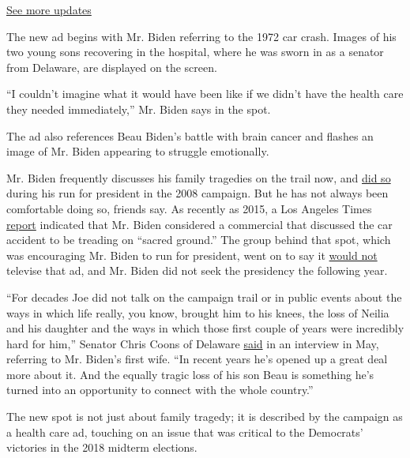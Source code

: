 \href{https://www.nytimes.com/2020/07/31/us/elections/biden-vs-trump.html?action=click\&pgtype=Article\&state=default\&region=MAIN_CONTENT_1\&context=storylines_live_updates}{See
more updates}

The new ad begins with Mr. Biden referring to the 1972 car crash. Images
of his two young sons recovering in the hospital, where he was sworn in
as a senator from Delaware, are displayed on the screen.

``I couldn't imagine what it would have been like if we didn't have the
health care they needed immediately,'' Mr. Biden says in the spot.

The ad also references Beau Biden's battle with brain cancer and flashes
an image of Mr. Biden appearing to struggle emotionally.

Mr. Biden frequently discusses his family tragedies on the trail now,
and
\href{https://www.nytimes.com/2007/12/14/us/politics/14biden.html}{did
so} during his run for president in the 2008 campaign. But he has not
always been comfortable doing so, friends say. As recently as 2015, a
Los Angeles Times
\href{https://www.latimes.com/nation/politics/trailguide/la-na-trailguide-10082015-htmlstory.html}{report}
indicated that Mr. Biden considered a commercial that discussed the car
accident to be treading on ``sacred ground.'' The group behind that
spot, which was encouraging Mr. Biden to run for president, went on to
say it
\href{https://www.nytimes.com/politics/first-draft/2015/10/08/citing-joe-bidens-wishes-pro-biden-group-will-not-air-ad-recounting-the-deaths-of-his-first-wife-and-his-daughter/}{would
not} televise that ad, and Mr. Biden did not seek the presidency the
following year.

``For decades Joe did not talk on the campaign trail or in public events
about the ways in which life really, you know, brought him to his knees,
the loss of Neilia and his daughter and the ways in which those first
couple of years were incredibly hard for him,'' Senator Chris Coons of
Delaware
\href{https://www.nytimes.com/2019/05/30/us/politics/joe-biden-beau-biden-death.html}{said}
in an interview in May, referring to Mr. Biden's first wife. ``In recent
years he's opened up a great deal more about it. And the equally tragic
loss of his son Beau is something he's turned into an opportunity to
connect with the whole country.''

The new spot is not just about family tragedy; it is described by the
campaign as a health care ad, touching on an issue that was critical to
the Democrats' victories in the 2018 midterm elections.

